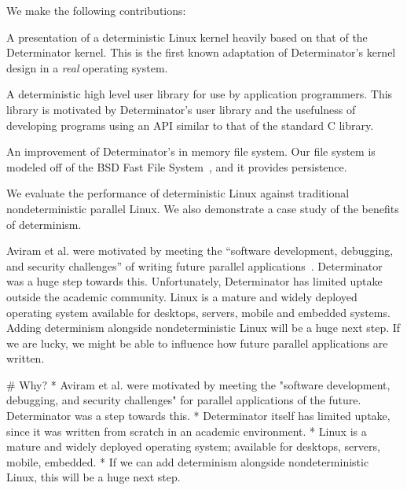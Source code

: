 \fi

We make the following contributions:
\begin{myitemize4}
    \item A presentation of a deterministic Linux kernel heavily based on that
    of the Determinator kernel. This is the first known adaptation of
    Determinator's kernel design in a \emph{real} operating system.
    \item A deterministic high level user library for use by application
    programmers. This library is motivated by Determinator's user library and
    the usefulness of developing programs using an API similar to that of the
    standard C library.
    \item An improvement of Determinator's in memory file system. Our file
    system is modeled off of the BSD Fast File System~\cite{mckusick1984fast},
    and it provides persistence.
    \item We evaluate the performance of deterministic Linux against traditional
    nondeterministic parallel Linux. We also demonstrate a case study of the
    benefits of determinism.
\end{myitemize4}

\iffalse

# Contributions
* We make the following contributions:
* The first known adaptation of Determinator's design to a widely deployed OS.
* A high-level user library for application developers, similar to
  Determinator's user library.
* An improvement of Determinator's in-memory file system based on BSD Fast
  file system.
* An evaluation of deterministic Linux against legacy nondeterministic Linux and
  a case study of deterministic execution's benefits.

\fi

Aviram et al. were motivated by meeting the ``software development, debugging,
and security challenges'' of writing future parallel
applications~\cite{Aviram10}. Determinator was a huge step towards this.
Unfortunately, Determinator has limited uptake outside the academic community.
Linux is a mature and widely deployed operating system available for desktops,
servers, mobile and embedded systems. Adding determinism alongside
nondeterministic Linux will be a huge next step. If we are lucky, we might be
able to influence how future parallel applications are written.

\iffalse

# Why?
* Aviram et al. were motivated by meeting the "software development, debugging,
  and security challenges" for parallel applications of the future. Determinator
  was a step towards this.
* Determinator itself has limited uptake, since it was written from scratch in
  an academic environment.
* Linux is a mature and widely deployed operating system; available for
  desktops, servers, mobile, embedded.
* If we can add determinism alongside nondeterministic Linux, this will be a
  huge next step.


